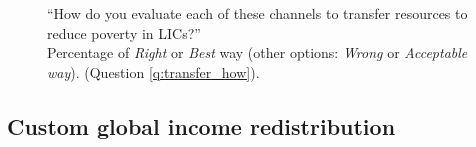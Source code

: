 \documentclass[12pt,english]{article}
\begin{document}
\begin{bibunit}
\begin{figure}[h!]
    \caption[\textit{Right} or \textit{Best way} to transfer resources to LICs (global average)]{``How do you evaluate each of these channels to transfer resources to reduce poverty in LICs?''\\ Percentage of \textit{Right} or \textit{Best} way (other options: \textit{Wrong} or \textit{Acceptable way}). (Question \ref{q:transfer_how}).
    }\label{fig:transfer_how}
\end{figure}

\subsection{Custom global income redistribution}\label{subsec:custom_redistr}


\end{bibunit}
\end{document}
